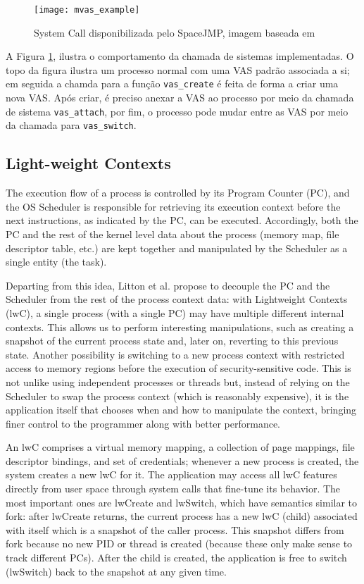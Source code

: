 \begin{figure}[!h]
  \centering
  \texttt{[image: mvas\_example]} 
  \caption{System Call disponibilizada pelo SpaceJMP, imagem baseada em \cite{ellarge}}
  \label{fig:mvas_example}
\end{figure}

A Figura \ref{fig:mvas_example}, ilustra o comportamento da chamada de sistemas
implementadas. O topo da figura ilustra um processo normal com uma VAS padrão
associada a si; em seguida a chamda para a função \texttt{vas\_create} é feita
de forma a criar uma nova VAS. Após criar, é preciso anexar a VAS ao processo
por meio da chamada de sistema \texttt{vas\_attach}, por fim, o processo pode
mudar entre as VAS por meio da chamada para \texttt{vas\_switch}.

\subsection{Light-weight Contexts}

The execution flow of a process is controlled by its Program Counter (PC), and
the OS Scheduler is responsible for retrieving its execution context before the
next instructions, as indicated by the PC, can be executed. Accordingly, both
the PC and the rest of the kernel level data about the process (memory map,
file descriptor table, etc.) are kept together and manipulated by the Scheduler
as a single entity (the task).

Departing from this idea, Litton et al. propose to decouple the PC and the
Scheduler from the rest of the process context data: with Lightweight Contexts
(lwC), a single process (with a single PC) may have multiple different internal
contexts. This allows us to perform interesting manipulations, such as creating
a snapshot of the current process state and, later on, reverting to this
previous state. Another possibility is switching to a new process context with
restricted access to memory regions before the execution of security-sensitive
code. This is not unlike using independent processes or threads but, instead of
relying on the Scheduler to swap the process context (which is reasonably
expensive), it is the application itself that chooses when and how to
manipulate the context, bringing finer control to the programmer along with
better performance.

An lwC comprises a virtual memory mapping, a collection of page mappings, file
descriptor bindings, and set of credentials; whenever a new process is created,
the system creates a new lwC for it. The application may access all lwC
features directly from user space through system calls that fine-tune its
behavior. The most important ones are lwCreate and lwSwitch, which have
semantics similar to fork: after lwCreate returns, the current process has a
new lwC (child) associated with itself which is a snapshot of the caller
process. This snapshot differs from fork because no new PID or thread is
created (because these only make sense to track different PCs). After the child
is created, the application is free to switch (lwSwitch) back to the snapshot
at any given time.

